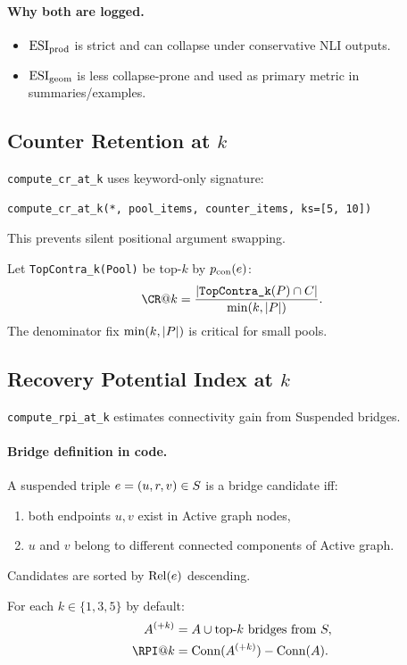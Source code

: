 \paragraph{Why both are logged.}
\begin{itemize}
\item $\operatorname{ESI}_{\mathrm{prod}}$ is strict and can collapse under conservative NLI outputs.
\item $\operatorname{ESI}_{\mathrm{geom}}$ is less collapse-prone and used as primary metric in summaries/examples.
\end{itemize}

\subsection{Counter Retention at $k$}
\texttt{compute\_cr\_at\_k} uses keyword-only signature:
\begin{lstlisting}[style=jsonstyle]
compute_cr_at_k(*, pool_items, counter_items, ks=[5, 10])
\end{lstlisting}
This prevents silent positional argument swapping.

Let \texttt{TopContra\_k(Pool)} be top-$k$ by $p_{\mathrm{con}}(e)$:
\begin{equation}
\CR@k = \frac{|\texttt{TopContra\_k}(\Pool)\cap\Counter|}{\min(k,|\Pool|)}.
\end{equation}
The denominator fix \(\min(k,|P|)\) is critical for small pools.

\subsection{Recovery Potential Index at $k$}
\texttt{compute\_rpi\_at\_k} estimates connectivity gain from Suspended bridges.

\paragraph{Bridge definition in code.}
A suspended triple $e=(u,r,v)\in S$ is a bridge candidate iff:
\begin{enumerate}
\item both endpoints $u,v$ exist in Active graph nodes,
\item $u$ and $v$ belong to different connected components of Active graph.
\end{enumerate}
Candidates are sorted by $\operatorname{Rel}(e)$ descending.

For each $k\in\{1,3,5\}$ by default:
\begin{align}
\Active^{(+k)} &= \Active \cup \text{top-}k\text{ bridges from }\Susp, \\
\RPI@k &= \Conn(\Active^{(+k)}) - \Conn(\Active).
\end{align}

